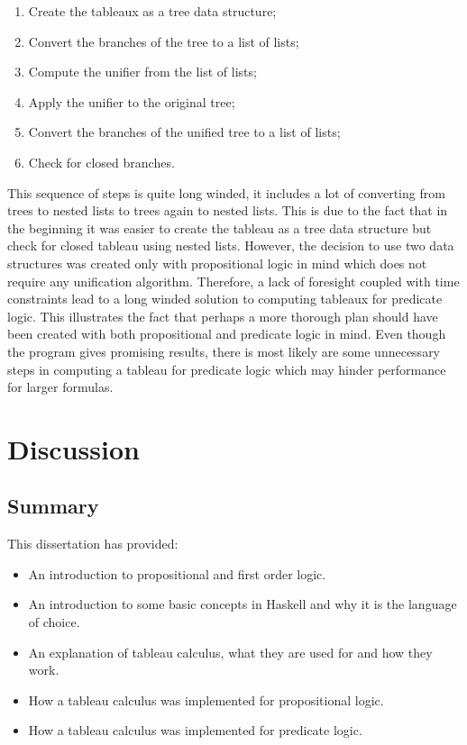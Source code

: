 \documentclass{article}%
\begin{document}
\begin{enumerate}
\item Create the tableaux as a tree data structure;
\item Convert the branches of the tree to a list of lists;
\item Compute the unifier from the list of lists;
\item Apply the unifier to the original tree;
\item Convert the branches of the unified tree to a list of lists;
\item Check for closed branches.
\end{enumerate}
This sequence of steps is quite long winded, it includes a lot of converting from trees to nested lists to trees again to nested lists. This is due to the fact that in the beginning it was easier to create the tableau as a tree data structure but check for closed tableau using nested lists. However, the decision to use two data structures was created only with propositional logic in mind which does not require any unification algorithm. Therefore, a lack of foresight coupled with time constraints lead to a long winded solution to computing tableaux for predicate logic. This illustrates the fact that perhaps a more thorough plan should have been created with both propositional and predicate logic in mind. Even though the program gives promising results, there is most likely are some unnecessary steps in computing a tableau for predicate logic which may hinder performance for larger formulas. 
\section{Discussion}
\subsection{Summary}
This dissertation has provided:
\begin{itemize}
\item An introduction to propositional and first order logic.
\item An introduction to some basic concepts in Haskell and why it is the language of choice. 
\item An explanation of tableau calculus, what they are used for and how they work. 
\item How a tableau calculus was implemented for propositional logic.
\item How a tableau calculus was implemented for predicate logic. 
\end{itemize}
\end{document}
